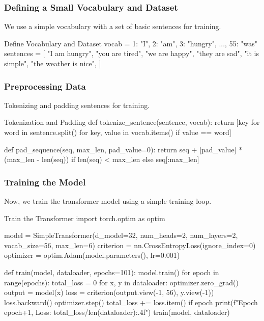 \subsubsection{Defining a Small Vocabulary and Dataset}
We use a simple vocabulary with a set of basic sentences for training.

\begin{codeonly}{Define Vocabulary and Dataset}
vocab = {1: "I", 2: "am", 3: "hungry", ..., 55: "was"}
sentences = [
    "I am hungry",
    "you are tired",
    "we are happy",
    "they are sad",
    "it is simple",
    "the weather is nice",
]
\end{codeonly}

\subsubsection{Preprocessing Data}
Tokenizing and padding sentences for training.

\begin{codeonly}{Tokenization and Padding}
def tokenize_sentence(sentence, vocab):
    return [key for word in sentence.split() for key, value in vocab.items() if value == word]

def pad_sequence(seq, max_len, pad_value=0):
    return seq + [pad_value] * (max_len - len(seq)) if len(seq) < max_len else seq[:max_len]
\end{codeonly}

\subsubsection{Training the Model}
Now, we train the transformer model using a simple training loop.

\begin{codeonly}{Train the Transformer}
import torch.optim as optim

model = SimpleTransformer(d_model=32, num_heads=2, num_layers=2, vocab_size=56, max_len=6)
criterion = nn.CrossEntropyLoss(ignore_index=0)
optimizer = optim.Adam(model.parameters(), lr=0.001)

def train(model, dataloader, epochs=101):
    model.train()
    for epoch in range(epochs):
        total_loss = 0
        for x, y in dataloader:
            optimizer.zero_grad()
            output = model(x)
            loss = criterion(output.view(-1, 56), y.view(-1))
            loss.backward()
            optimizer.step()
            total_loss += loss.item()
        if epoch %
            print(f"Epoch {epoch+1}, Loss: {total_loss/len(dataloader):.4f}")
train(model, dataloader)
\end{codeonly}

